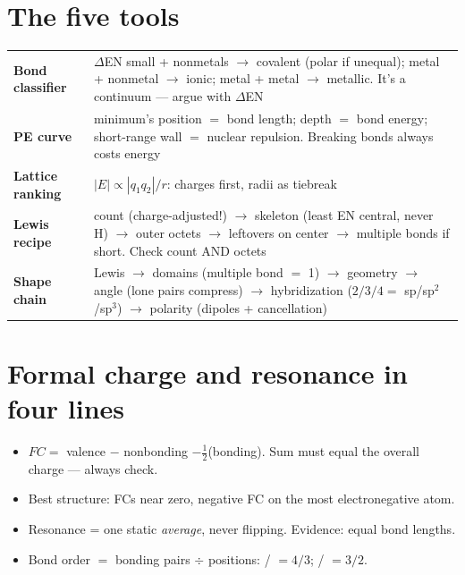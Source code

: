 \documentclass{apchem-worksheet}
\begin{document}
\apctitleblock

\section*{\sffamily The five tools}

\renewcommand{\arraystretch}{1.5}
\noindent\begin{tabular}{@{}p{4.2cm}p{9.5cm}@{}}
\toprule
\textbf{Bond classifier} & $\Delta$EN small + nonmetals $\to$ covalent
  (polar if unequal); metal + nonmetal $\to$ ionic; metal + metal $\to$
  metallic. It's a continuum --- argue with $\Delta$EN\\
\textbf{PE curve} & minimum's position $=$ bond length; depth $=$ bond
  energy; short-range wall $=$ nuclear repulsion. Breaking bonds always
  costs energy\\
\textbf{Lattice ranking} & $|E| \propto |q_1q_2|/r$: charges first, radii
  as tiebreak\\
\textbf{Lewis recipe} & count (charge-adjusted!) $\to$ skeleton (least EN
  central, never H) $\to$ outer octets $\to$ leftovers on center $\to$
  multiple bonds if short. Check count AND octets\\
\textbf{Shape chain} & Lewis $\to$ domains (multiple bond $=$ 1) $\to$
  geometry $\to$ angle (lone pairs compress) $\to$ hybridization ($2/3/4 =$
  sp/sp$^2$/sp$^3$) $\to$ polarity (dipoles + cancellation)\\
\bottomrule
\end{tabular}

\section*{\sffamily Formal charge and resonance in four lines}

\begin{itemize}[leftmargin=*,itemsep=0.2em]
  \item $FC = $ valence $-$ nonbonding $- \frac12$(bonding). Sum must equal
        the overall charge --- always check.
  \item Best structure: FCs near zero, negative FC on the most
        electronegative atom.
  \item Resonance = one static \emph{average}, never flipping. Evidence:
        equal bond lengths.
  \item Bond order $=$ bonding pairs $\div$ positions: /
        $= 4/3$; / $= 3/2$.
\end{itemize}
\end{document}
